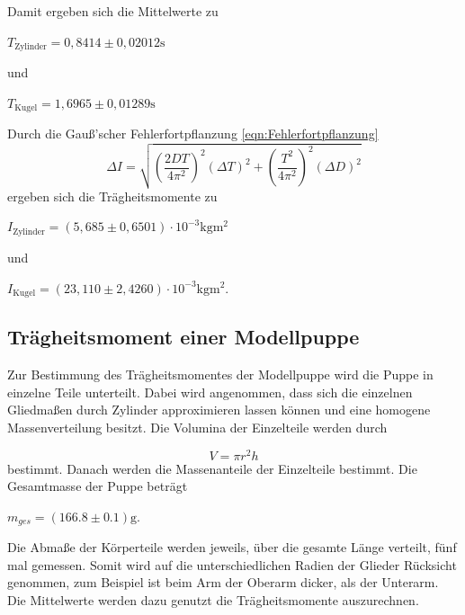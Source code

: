 Damit ergeben sich die Mittelwerte zu 

\begin{center}
  $T_{\text{Zylinder}} = 0,8414 \pm 0,02012 \si{\second} $
\end{center}

und

\begin{center}
  $ T_{\text{Kugel}} = 1,6965 \pm 0,01289 \si{\second} $
\end{center}

Durch die Gauß'scher Fehlerfortpflanzung \ref{eqn:Fehlerfortpflanzung}
\begin{equation}
  \Delta I = \sqrt{ (\frac{2DT}{4\pi^2})^2  (\Delta T)^2 + (\frac{T^2}{4\pi^2})^2 (\Delta D)^2}
  \label{eqn:Fehlerfortpflanzung}
\end{equation}
ergeben sich die Trägheitsmomente zu

\begin{center}
  $ I_{\text{Zylinder}} = (5,685 \pm 0,6501) \cdot 10^{-3} \si{\kilogram\meter^2} $ 
\end{center}

und

\begin{center}
  $ I_{\text{Kugel}} = (23,110 \pm 2,4260) \cdot 10^{-3} \si{\kilogram\meter^2} $.
\end{center}


\subsection{Trägheitsmoment einer Modellpuppe}
\label{sec:Trägheitsmoment einer Modellpuppe}

Zur Bestimmung des Trägheitsmomentes der Modellpuppe wird die Puppe in einzelne Teile unterteilt. Dabei wird angenommen,
dass sich die einzelnen Gliedmaßen durch Zylinder approximieren lassen können und eine homogene Massenverteilung besitzt. Die
Volumina der Einzelteile werden durch

\begin{equation}
  V = \pi r^2h
  \label{eqn:Volumen}
\end{equation}
 bestimmt. Danach werden die Massenanteile der Einzelteile bestimmt. Die Gesamtmasse der Puppe beträgt 

\begin{center}
  $m_{ges} = (166.8\pm 0.1)\si{\gram}$.
\end{center}


Die Abmaße der Körperteile werden jeweils, über die gesamte Länge verteilt, fünf mal gemessen. Somit wird auf die unterschiedlichen
Radien der Glieder Rücksicht genommen, zum Beispiel ist beim Arm der Oberarm dicker, als der Unterarm. Die Mittelwerte werden dazu genutzt die
Trägheitsmomente auszurechnen.

